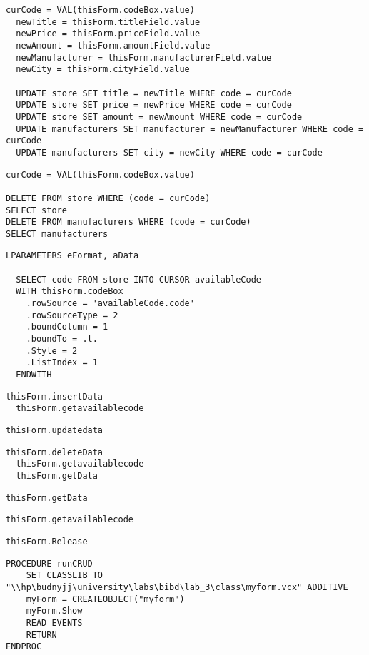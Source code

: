 \begin{lstlisting}[float=h,caption=myForm.updateData]
  curCode = VAL(thisForm.codeBox.value)
  newTitle = thisForm.titleField.value
  newPrice = thisForm.priceField.value
  newAmount = thisForm.amountField.value
  newManufacturer = thisForm.manufacturerField.value
  newCity = thisForm.cityField.value

  UPDATE store SET title = newTitle WHERE code = curCode
  UPDATE store SET price = newPrice WHERE code = curCode
  UPDATE store SET amount = newAmount WHERE code = curCode
  UPDATE manufacturers SET manufacturer = newManufacturer WHERE code = curCode
  UPDATE manufacturers SET city = newCity WHERE code = curCode
\end{lstlisting}

\begin{lstlisting}[float=h,caption=myForm.deleteData]
curCode = VAL(thisForm.codeBox.value)

DELETE FROM store WHERE (code = curCode)
SELECT store
DELETE FROM manufacturers WHERE (code = curCode)
SELECT manufacturers
\end{lstlisting}

\begin{lstlisting}[float=h,caption=myForm.getAvailableCode]
  LPARAMETERS eFormat, aData

  SELECT code FROM store INTO CURSOR availableCode
  WITH thisForm.codeBox
	.rowSource = 'availableCode.code'
	.rowSourceType = 2
	.boundColumn = 1
	.boundTo = .t.
	.Style = 2
	.ListIndex = 1
  ENDWITH
\end{lstlisting}

\begin{lstlisting}[float=h,caption=InsertButton.Click]
  thisForm.insertData
  thisForm.getavailablecode
\end{lstlisting}

\begin{lstlisting}[float=h,caption=UpdateButton.Click]
  thisForm.updatedata
\end{lstlisting}

\begin{lstlisting}[float=h,caption=DeleteButton.Click]
  thisForm.deleteData
  thisForm.getavailablecode
  thisForm.getData
\end{lstlisting}

\begin{lstlisting}[float=h,caption=CodeBox.Click]
  thisForm.getData
\end{lstlisting}

\begin{lstlisting}[float=h,caption=CodeBox.Init]
  thisForm.getavailablecode
\end{lstlisting}

\begin{lstlisting}[float=h,caption=CodeBox.Init]
  thisForm.Release
\end{lstlisting}

\begin{lstlisting}[float=h,caption=runCRUD]
PROCEDURE runCRUD
	SET CLASSLIB TO "\\hp\budnyjj\university\labs\bibd\lab_3\class\myform.vcx" ADDITIVE
	myForm = CREATEOBJECT("myform")
	myForm.Show
	READ EVENTS
	RETURN
ENDPROC
\end{lstlisting}